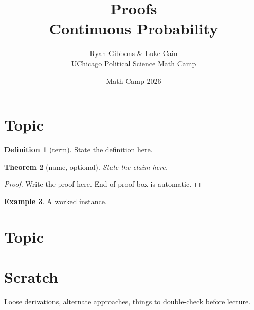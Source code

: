 \documentclass[11pt]{article}
\title{Proofs \\[0.35em] \large Continuous Probability}
\author{Ryan Gibbons \& Luke Cain \\ UChicago Political Science Math Camp}
\date{Math Camp 2026}
\theoremstyle{plain}
\newtheorem{theorem}{Theorem}[section]
\newtheorem{lemma}[theorem]{Lemma}
\theoremstyle{definition}
\newtheorem{definition}[theorem]{Definition}
\newtheorem{example}[theorem]{Example}
\theoremstyle{remark}
\begin{document}
\maketitle


\section{Topic}

\begin{definition}[term]
State the definition here.
\end{definition}

\begin{theorem}[name, optional]
State the claim here.
\end{theorem}

\begin{proof}
Write the proof here.  End-of-proof box is automatic.
\end{proof}

\begin{example}
A worked instance.
\end{example}


\section{Topic}



\section*{Scratch}

Loose derivations, alternate approaches, things to double-check before lecture.
\end{document}
